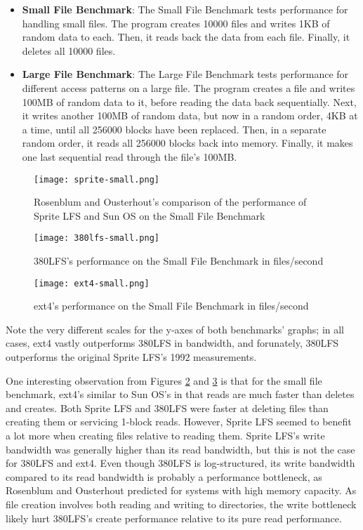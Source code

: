 \documentclass{article}
\begin{document}
\begin{itemize}
    \item \textbf{Small File Benchmark}: The Small File Benchmark tests performance for handling small files. The program creates 10000 files and writes 1KB of random data to each. Then, it reads back the data from each file. Finally, it deletes all 10000 files.
    \item \textbf{Large File Benchmark}: The Large File Benchmark tests performance for different access patterns on a large file. The program creates a file and writes 100MB of random data to it, before reading the data back sequentially. Next, it writes another 100MB of random data, but now in a random order, 4KB at a time, until all 256000 blocks have been replaced. Then, in a separate random order, it reads all 256000 blocks back into memory. Finally, it makes one last sequential read through the file's 100MB.
\end{itemize}
\begin{figure}[h!!!!]
    \centering
    \texttt{[image: sprite-small.png]}
    \caption{Rosenblum and Ousterhout's comparison of the performance of Sprite LFS and Sun OS on the Small File Benchmark}
    \label{fig:sprite-small}
\end{figure}
\begin{figure}[h!!!!]
    \centering
    \texttt{[image: 380lfs-small.png]}
    \caption{380LFS's performance on the Small File Benchmark in files/second}
    \label{fig:380lfs-small}
\end{figure}
\begin{figure}[h!!!!]
    \centering
    \texttt{[image: ext4-small.png]}
    \caption{ext4's performance on the Small File Benchmark in files/second}
    \label{fig:ext4-small}
\end{figure}

Note the very different scales for the y-axes of both benchmarks' graphs; in all cases, ext4 vastly outperforms 380LFS in bandwidth, and forunately, 380LFS outperforms the original Sprite LFS's 1992 measurements.

One interesting observation from Figures \ref{fig:380lfs-small} and \ref{fig:ext4-small} is that for the small file benchmark, ext4's similar to Sun OS's in that reads are much faster than deletes and creates. Both Sprite LFS and 380LFS were faster at deleting files than creating them or servicing 1-block reads. However, Sprite LFS seemed to benefit a lot more when creating files relative to reading them. Sprite LFS's write bandwidth was generally higher than its read bandwidth, but this is not the case for 380LFS and ext4. Even though 380LFS is log-structured, its write bandwidth compared to its read bandwidth is probably a performance bottleneck, as Rosenblum and Ousterhout predicted for systems with high memory capacity. As file creation involves both reading and writing to directories, the write bottleneck likely hurt 380LFS's create performance relative to its pure read performance.
\end{document}
